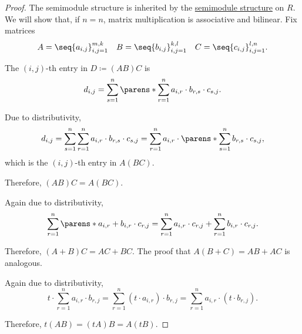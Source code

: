 \begin{proof}

  The semimodule structure is inherited by the \hyperref[thm:commutative_monoid_is_semimodule]{semimodule structure} on \( R \). We will show that, if \( n = n \), matrix multiplication is associative and bilinear. Fix matrices
  \begin{equation*}
    \begin{aligned}
      A = \seq{ a_{i,j} }_{i,j=1}^{m,k} && B = \seq{ b_{i,j} }_{i,j=1}^{k,l} && C = \seq{ c_{i,j} }_{i,j=1}^{l,n}.
    \end{aligned}
  \end{equation*}

   The \( (i, j) \)-th entry in \( D \coloneqq (AB)C \) is
  \begin{equation*}
    d_{i,j} = \sum_{s=1}^n \parens*{ \sum_{r=1}^n a_{i,r} \cdot b_{r,s} } \cdot c_{s,j}.
  \end{equation*}

  Due to distributivity,
  \begin{equation*}
    d_{i,j}
    =
    \sum_{s=1}^n \sum_{r=1}^n a_{i,r} \cdot b_{r,s} \cdot c_{s,j}
    =
    \sum_{r=1}^n a_{i,r} \cdot \parens*{ \sum_{s=1}^n b_{r,s} \cdot c_{s,j} },
  \end{equation*}
  which is the \( (i, j) \)-th entry in \( A(BC) \).

  Therefore, \( (AB)C = A(BC) \).

   Again due to distributivity,
  \begin{equation*}
    \sum_{r=1}^n \parens*{ a_{i,r} + b_{i,r} } \cdot c_{r,j}
    =
    \sum_{r=1}^n a_{i,r} \cdot c_{r,j} + \sum_{r=1}^n b_{i,r} \cdot c_{r,j}.
  \end{equation*}

  Therefore, \( (A + B)C = AC + BC \). The proof that \( A(B + C) = AB + AC \) is analogous.

   Again due to distributivity,
  \begin{equation*}
    t \cdot \sum_{r=1}^n a_{i,r} \cdot b_{r,j}
    =
    \sum_{r=1}^n (t \cdot a_{i,r}) \cdot b_{r,j}
    =
    \sum_{r=1}^n a_{i,r} \cdot (t \cdot b_{r,j}).
  \end{equation*}

  Therefore, \( t(AB) = (tA)B = A(tB) \).
\end{proof}

